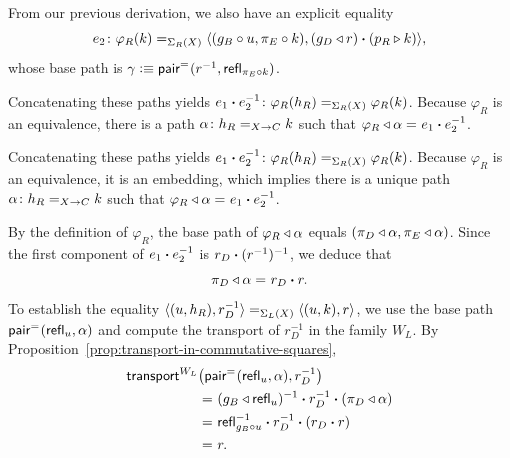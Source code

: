 \begin{solution}
    From our previous derivation, we also have an explicit equality
    \[
        e_2\colon\varphi_R(k)
        \eq{\Sigma_R(X)}
        \dep{
            (g_B\circ u,\pi_E\circ k),
            (g_D\lwct r)\ct(p_R\rwct k)
        },
    \]
    whose base path is $\gamma\mathrel{\vcentcolon}\equiv\mathsf{pair}^{\mathrel{=_{}}}(r^{-1},\mathsf{refl}_{\pi_E\circ k})$.

    Concatenating these paths yields $e_1\ct e_2^{-1}\colon\varphi_R(h_R)\eq{\Sigma_R(X)}\varphi_R(k)$. Because $\varphi_R$ is an equivalence, there is a path $\alpha\colon h_R\eq{X\to C}k$ such that $\varphi_R\triangleleft\alpha\mathrel{=_{}}e_1\mathbin{\boldsymbol{\cdot}} e_2^{-1}$.


    Concatenating these paths yields\/ $e_1\ct e_2^{-1}\colon\varphi_R(h_R)\eq{\Sigma_R(X)}\varphi_R(k)$. Because\/ $\varphi_R$ is an equivalence, it is an embedding, which implies there is a unique path\/ $\alpha\colon h_R\eq{X\to C}k$ such that\/ $\varphi_R\triangleleft\alpha\mathrel{=_{}}e_1\mathbin{\boldsymbol{\cdot}} e_2^{-1}$.

    By the definition of $\varphi_R$, the base path of $\varphi_R\triangleleft\alpha$ equals $(\pi_D\triangleleft\alpha,\pi_E\triangleleft\alpha)$. Since the first component of $e_1\mathbin{\boldsymbol{\cdot}} e_2^{-1}$ is $r_D\mathbin{\boldsymbol{\cdot}}(r^{-1})^{-1}$, we deduce that
    \[
        \pi_D\triangleleft\alpha\mathrel{=_{}}r_D\mathbin{\boldsymbol{\cdot}} r.
    \]
    To establish the equality $\langle(u,h_R),r_D^{-1}\rangle\mathrel{=_{\Sigma_L(X)}}\langle(u,k),r\rangle$, we use the base path $\mathsf{pair}^{\mathrel{=_{}}}(\mathsf{refl}_u,\alpha)$ and compute the transport of $r_D^{-1}$ in the family $W_L$. By Proposition~\ref{prop:transport-in-commutative-squares},
    \begin{align*}
        \mathsf{transport}^{W_L}&\bigl(\mathsf{pair}^{\mathrel{=_{}}}(\mathsf{refl}_u,\alpha), r_D^{-1}\bigr)\\
            &\mathrel{=_{}}(g_B\triangleleft\mathsf{refl}_u)^{-1}\mathbin{\boldsymbol{\cdot}} r_D^{-1}\mathbin{\boldsymbol{\cdot}}(\pi_D\triangleleft\alpha)\\
            &\mathrel{=_{}}\mathsf{refl}_{g_B\circ u}^{-1}\mathbin{\boldsymbol{\cdot}} r_D^{-1}\mathbin{\boldsymbol{\cdot}}(r_D\mathbin{\boldsymbol{\cdot}} r)\\
            &\mathrel{=_{}}r.
    \end{align*}


\end{solution}
